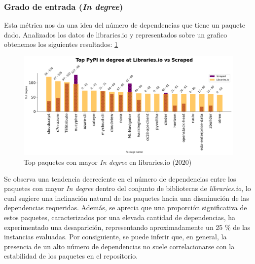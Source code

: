 \subsubsection{Grado de entrada (\textit{In degree})}

Esta métrica nos da una idea del número de dependencias que tiene un paquete dado.
Analizados los datos de libraries.io y representados sobre un grafico obtenemos los siguientes resultados: \ref{fig:pypi_libio_ind_comparison}

\begin{figure}[ht!]
    \begin{center}
        \includegraphics[width=1\textwidth]{img/pypi/libio_t20_ind_comparison.png}
        \caption{Top paquetes con mayor \textit{In degree} en libraries.io (2020)}
        \label{fig:pypi_libio_ind_comparison}
    \end{center}
\end{figure}

Se observa una tendencia decreciente en el número de dependencias entre los paquetes con mayor \textit{In degree}
dentro del conjunto de bibliotecas de \textit{libraries.io}, lo cual sugiere una inclinación natural de los
paquetes hacia una disminución de las dependencias requeridas. Además, se aprecia que una proporción significativa
de estos paquetes, caracterizados por una elevada cantidad de dependencias, ha experimentado una desaparición,
representando aproximadamente un 25 \% de las instancias evaluadas. Por consiguiente, se puede inferir que,
en general, la presencia de un alto número de dependencias no suele correlacionarse con la estabilidad de
los paquetes en el repositorio.

